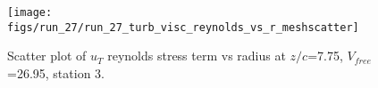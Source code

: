 \begin{figure}[H]
\centering
\texttt{[image: figs/run\_27/run\_27\_turb\_visc\_reynolds\_vs\_r\_meshscatter]}
\caption{Scatter plot of $
u_T$ reynolds stress term vs radius at $z/c$=7.75, $V_{free}$=26.95, station 3.}
\label{fig:run_27_turb_visc_reynolds_vs_r_meshscatter}
\end{figure}



